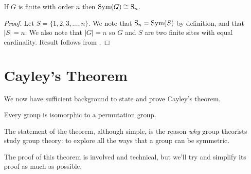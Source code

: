 \begin{corollary}\label{corollary-symmetric-group-of-finite-order}
    If $G$ is finite with order $n$ then $\mathrm{Sym}(G) \cong \mathrm{S}_{n}$.
\end{corollary}
\begin{proof}
    Let $S = \{1, 2, 3, \dots, n\}$. We note that $\mathrm{S}_{n} = \mathrm{Sym}(S)$ by definition, and that $|S| = n$. We also note that $|G| = n$ so $G$ and $S$ are two finite sites with equal cardinality. Result follows from .
\end{proof}

\section{Cayley's Theorem}
We now have sufficient background to state and prove Cayley's theorem.

\begin{theorem}[Cayley]\label{thrm-cayley}
    Every group is isomorphic to a permutation group.
\end{theorem}

The statement of the theorem, although simple, is the reason \textit{why} group theorists study group theory: to explore all the ways that a group can be symmetric.

The proof of this theorem is involved and technical, but we'll try and simplify its proof as much as possible.

